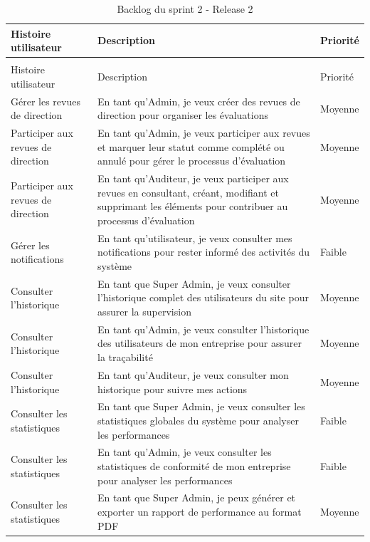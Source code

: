 \begin{longtable}{|>{\raggedright\arraybackslash}p{4cm}|>{\raggedright\arraybackslash}p{7cm}|>{\raggedright\arraybackslash}p{2cm}|}
\caption{Backlog du sprint 2 - Release 2}
\label{tab:sprint2_release2_backlog}\\
\hline
Histoire utilisateur & Description & Priorité \\
\hline
\endfirsthead
\multicolumn{3}{c}{\tablename\ \thetable\ -- suite} \\
\hline
Histoire utilisateur & Description & Priorité \\
\hline
\endhead
Gérer les revues de direction & En tant qu'Admin, je veux créer des revues de direction pour organiser les évaluations & Moyenne \\
\hline
Participer aux revues de direction & En tant qu'Admin, je veux participer aux revues et marquer leur statut comme complété ou annulé pour gérer le processus d'évaluation & Moyenne \\
\hline
Participer aux revues de direction & En tant qu'Auditeur, je veux participer aux revues en consultant, créant, modifiant et supprimant les éléments pour contribuer au processus d'évaluation & Moyenne \\
\hline
Gérer les notifications & En tant qu'utilisateur, je veux consulter mes notifications pour rester informé des activités du système & Faible \\
\hline
Consulter l'historique & En tant que Super Admin, je veux consulter l'historique complet des utilisateurs du site pour assurer la supervision & Moyenne \\
\hline
Consulter l'historique & En tant qu'Admin, je veux consulter l'historique des utilisateurs de mon entreprise pour assurer la traçabilité & Moyenne \\
\hline
Consulter l'historique & En tant qu'Auditeur, je veux consulter mon historique pour suivre mes actions & Moyenne \\
\hline 
Consulter les statistiques & En tant que Super Admin, je veux consulter les statistiques globales du système pour analyser les performances & Faible \\
\hline
Consulter les statistiques & En tant qu'Admin, je veux consulter les statistiques de conformité de mon entreprise pour analyser les performances & Faible \\
\hline
Consulter les statistiques & En tant que Super Admin, je peux générer et exporter un rapport de performance au format PDF & Moyenne \\
\hline
\end{longtable} 

